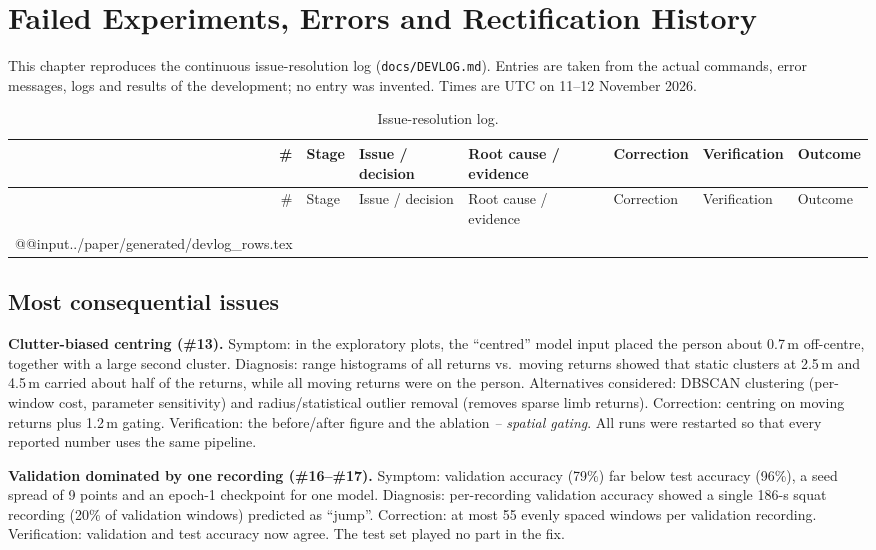 \chapter{Failed Experiments, Errors and Rectification History}

This chapter reproduces the continuous issue-resolution log
(\texttt{docs/DEVLOG.md}). Entries are taken from the actual commands, error
messages, logs and results of the development; no entry was invented. Times are
UTC on 11--12 November 2026.

{\footnotesize
\setlength{\tabcolsep}{3pt}
\begin{longtable}{@{}r L{1.5cm}L{3.0cm}L{3.0cm}L{3.0cm}L{2.4cm}L{2.0cm}@{}}
\caption{Issue-resolution log.}\label{tab:devlog}\\
\toprule
\# & Stage & Issue / decision & Root cause / evidence & Correction & Verification & Outcome \\
\midrule\endfirsthead
\toprule \# & Stage & Issue / decision & Root cause / evidence & Correction & Verification & Outcome \\ \midrule\endhead
\csname @@input\endcsname ../paper/generated/devlog_rows.tex 
\bottomrule
\end{longtable}}

\section{Most consequential issues}
\textbf{Clutter-biased centring (\#13).} Symptom: in the exploratory plots, the
``centred'' model input placed the person about 0.7\,m off-centre, together with
a large second cluster. Diagnosis: range histograms of all returns vs.\ moving
returns showed that static clusters at 2.5\,m and 4.5\,m carried about half of
the returns, while all moving returns were on the person. Alternatives
considered: DBSCAN clustering (per-window cost, parameter sensitivity) and
radius/statistical outlier removal (removes sparse limb returns). Correction:
centring on moving returns plus 1.2\,m gating. Verification: the
before/after figure and the ablation \emph{-- spatial gating}. All runs were
restarted so that every reported number uses the same pipeline.

\textbf{Validation dominated by one recording (\#16--\#17).} Symptom: validation
accuracy (79\%) far below test accuracy (96\%), a seed spread of 9 points and an
epoch-1 checkpoint for one model. Diagnosis: per-recording validation accuracy
showed a single 186-s squat recording (20\% of validation windows) predicted as
``jump''. Correction: at most 55 evenly spaced windows per validation recording.
Verification: validation and test accuracy now agree. The test set played no
part in the fix.

